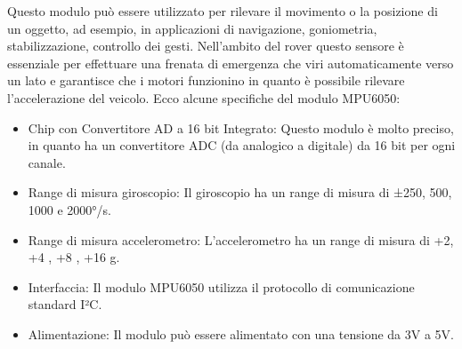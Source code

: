 \documentclass{article}
\begin{document}
Questo modulo può essere utilizzato per rilevare il movimento o la posizione di un oggetto, ad esempio, in applicazioni di navigazione, goniometria, stabilizzazione, controllo dei gesti.
Nell'ambito del rover questo sensore è essenziale per effettuare una frenata di emergenza che viri automaticamente verso un lato e  garantisce che i motori funzionino in quanto è possibile rilevare l'accelerazione del veicolo.
Ecco alcune specifiche del modulo MPU6050:

\begin{itemize}
    \item Chip con Convertitore AD a 16 bit Integrato: Questo modulo è molto preciso, in quanto ha un convertitore ADC (da analogico a digitale) da 16 bit per ogni canale.
    \item Range di misura giroscopio: Il giroscopio ha un range di misura di ±250, 500, 1000 e 2000°/s.
    \item Range di misura accelerometro: L’accelerometro ha un range di misura di +2, +4 , +8 , +16 g.
    \item Interfaccia: Il modulo MPU6050 utilizza il protocollo di comunicazione standard I²C.
    \item Alimentazione: Il modulo può essere alimentato con una tensione da 3V a 5V.
\end{itemize}
\end{document}
